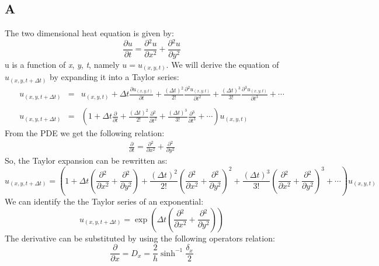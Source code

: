 \documentclass[11pt, a4paper]{article}
\newcommand{\parder}[2]{\frac{\partial {#1}}{\partial {#2}}}
\begin{document}
\subsection{A}
The two dimensional heat equation is given by:
\begin{equation}
    \parder{u}{t}=\parder{^2u}{x^2}+\parder{^2u}{y^2}
\end{equation}
u is a function of \emph{x}, \emph{y}, \emph{t}, namely $u=u_{\left(x,y,t\right)}$. We will derive the equation of $u_{\left(x,y,t+\Delta t\right)}$ by expanding it into a Taylor series:
\begin{equation}
    \begin{array}{rcl}
        \displaystyle u_{\left(x,y,t+\Delta t\right)} & = & \displaystyle u_{\left(x,y,t\right)}+\Delta t\parder{u_{\left(x,y,t\right)}}{t}+\frac{\left(\Delta t\right)^2}{2!}\parder{^2u_{\left(x,y,t\right)}}{t^2} +\frac{\left(\Delta t\right)^3}{3!}\parder{^3u_{\left(x,y,t\right)}}{t^3}+\cdots \\\\
        \displaystyle u_{\left(x,y,t+\Delta t\right)} & = & \displaystyle \left(1+\Delta t\parder{}{t}+\frac{\left(\Delta t\right)^2}{2!}\parder{^2}{t^2} +\frac{\left(\Delta t\right)^3}{3!}\parder{^3}{t^3}+\cdots\right)u_{\left(x,y,t\right)}
    \end{array}
\end{equation}
From the PDE we get the following relation:
\begin{equation}
    \begin{matrix}
        \displaystyle \parder{}{t}=\parder{^2}{x^2}+\parder{^2}{y^2}
    \end{matrix}
\end{equation}
So, the Taylor expansion can be rewritten as:
\begin{equation}
    \displaystyle u_{\left(x,y,t+\Delta t\right)}=\displaystyle \left(1+\Delta t\left(\parder{^2}{x^2}+\parder{^2}{y^2}\right)+\frac{\left(\Delta t\right)^2}{2!}\left(\parder{^2}{x^2}+\parder{^2}{y^2}\right)^2 +\frac{\left(\Delta t\right)^3}{3!}\left(\parder{^2}{x^2}+\parder{^2}{y^2}\right)^3+\cdots\right)u_{\left(x,y,t\right)}
\end{equation}
We can identify the the Taylor series of an exponential:
\begin{equation}
    \displaystyle u_{\left(x,y,t+\Delta t\right)}=\exp{\left(\Delta t\left(\parder{^2}{x^2}+\parder{^2}{y^2}\right)\right)}
\end{equation}
The derivative can be substituted by using the following operators relation:
\begin{equation}
    \parder{}{x}=D_x=\frac{2}{h}\sinh^{-1}{\frac{\delta_x}{2}}
\end{equation}
\end{document}
